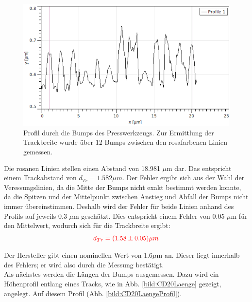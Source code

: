 \begin{figure}[h]
    \centering
    \includegraphics[scale = 0.65]{Bilder/CD20Profil.png}
    \caption{Profil durch die Bumps des Presswerkzeugs. Zur Ermittlung der Trackbreite wurde über 12 Bumps zwischen den rosafarbenen 
    Linien gemessen.}
    \label{bild:CD20Profil}
\end{figure}


Die rosanen Linien stellen einen Abstand von 18.981 $\mu$m dar. Das entspricht einem Trackabstand von $d_{Tr} = 1.582 \mu m$.
Der Fehler ergibt sich aus der Wahl der Veressungslinien, da die Mitte der Bumps nicht exakt bestimmt werden konnte, da die Spitzen und 
der Mittelpunkt zwischen Anstieg und Abfall der Bumps nicht immer übereinstimmen. Deshalb wird der Fehler für beide Linien anhand des 
Profils auf jeweils 0.3 $\mu$m geschätzt. Dies entspricht einem Fehler von 0.05 $\mu$m für den Mittelwert, wodurch sich für die Trackbreite 
ergibt: 
\begin{equation*}
    \textcolor{red}{d_{Tr} = (1.58 \pm 0.05) \mu m}
\end{equation*}

Der Hersteller gibt einen nominellen Wert von 1.6$\mu$m an. Dieser liegt innerhalb des Fehlers; er wird also durch die Messung bestätigt.\\
Als nächstes werden die Längen der Bumps ausgemessen. Dazu wird ein Höhenprofil entlang eines Tracks, wie in Abb. \ref{bild:CD20Laenge} 
gezeigt, angelegt. Auf diesem Profil (Abb. \ref{bild:CD20LaengeProfil}). 

